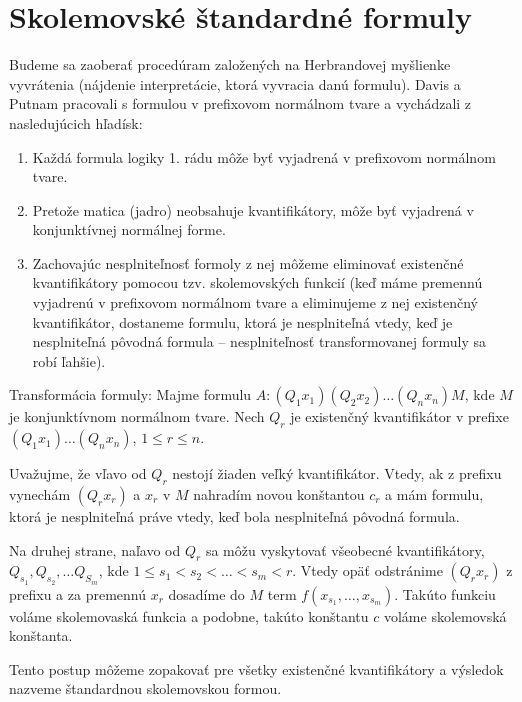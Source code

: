 \section{Skolemovské štandardné formuly}

Budeme sa zaoberať procedúram založených na Herbrandovej myšlienke vyvrátenia 
(nájdenie interpretácie, ktorá vyvracia danú formulu).
Davis a Putnam pracovali s formulou v prefixovom
normálnom tvare a vychádzali z nasledujúcich hľadísk:
\begin{enumerate}
    \item Každá formula logiky 1. rádu
        môže byť vyjadrená v prefixovom normálnom tvare.

    \item Pretože matica (jadro) neobsahuje kvantifikátory, môže byť
        vyjadrená v konjunktívnej normálnej forme.

    \item Zachovajúc nesplniteľnosť formoly z nej môžeme eliminovať
        existenčné kvantifikátory pomocou tzv. skolemovských funkcií (keď máme
        premennú vyjadrenú v prefixovom normálnom tvare a eliminujeme z nej
        existenčný kvantifikátor, dostaneme formulu, ktorá je nesplniteľná
        vtedy, keď je nesplniteľná pôvodná formula -- nesplniteľnosť
        transformovanej formuly sa robí ľahšie).
\end{enumerate}

Transformácia formuly:
Majme formulu $A: (Q_1 x_1) (Q_2 x_2) \ldots (Q_n x_n) M$,
kde $M$ je konjunktívnom normálnom tvare.
Nech $Q_r$ je existenčný kvantifikátor v prefixe $(Q_1 x_1) \ldots
(Q_n x_n)$, $1 \le r \le n$.

Uvažujme, že vľavo od $Q_r$ nestojí žiaden veľký kvantifikátor.
Vtedy, ak z prefixu vynechám $(Q_r x_r)$ a $x_r$ v $M$ nahradím
novou konštantou $c_r$ a mám formulu, ktorá je nesplniteľná práve
vtedy, keď bola nesplniteľná pôvodná formula.

Na druhej strane, naľavo od $Q_r$ sa môžu vyskytovať všeobecné
kvantifikátory, $Q_{s_1}, Q_{s_2}, \dots Q_{S_m}$,
kde $1 \le s_1 < s_2 < \dots < s_m < r$.
Vtedy opäť odstránime $(Q_r x_r)$ z prefixu a
za premennú $x_r$ dosadíme do $M$ term 
$f(x_{s_1}, \ldots, x_{s_m})$. Takúto funkciu voláme skolemovaská
funkcia a podobne, takúto konštantu $c$ voláme skolemovská konštanta.

Tento postup môžeme zopakovať pre všetky existenčné kvantifikátory a
výsledok nazveme štandardnou skolemovskou formou.

